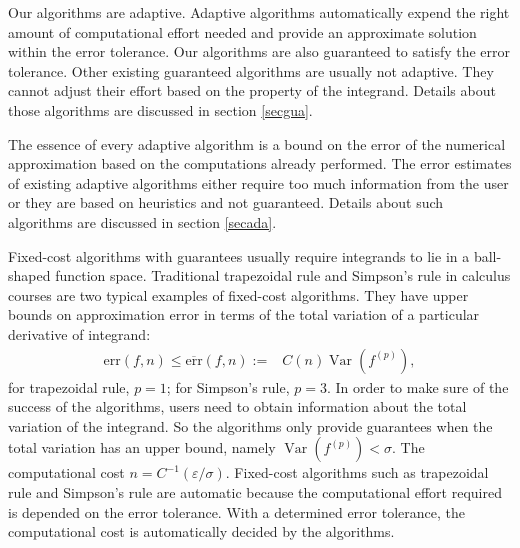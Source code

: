 \documentclass{iitthesis}
\DeclareMathOperator{\Var}{Var}
\theoremstyle{definition}
\theoremstyle{remark}
\begin{document}
Our algorithms are adaptive. Adaptive algorithms automatically expend the right amount of computational effort needed and provide an approximate solution within the error tolerance. Our algorithms are also guaranteed to satisfy the error tolerance. Other existing guaranteed algorithms are usually not adaptive. They cannot adjust their effort based on the property of the integrand. Details about those algorithms are discussed in section \ref{secgua}.

The essence of every adaptive algorithm is a bound on the error of the numerical approximation based on the computations already performed. The error estimates of existing adaptive algorithms either require too much information from the user or they are based on heuristics and not guaranteed. Details about such algorithms are discussed in section \ref{secada}.

\label{secgua}

Fixed-cost algorithms with guarantees usually require integrands to lie in a ball-shaped function space. Traditional trapezoidal rule and Simpson's rule in calculus courses are two typical examples of fixed-cost algorithms. They have upper bounds on approximation error in terms of the total variation of a particular derivative of integrand:
\begin{align}\label{errorsimple}
    \text{err}(f,n)\le\overline{\text{err}}(f,n):=&C(n)\Var(f^{(p)}),
\end{align}
for trapezoidal rule, $p=1$; for Simpson's rule, $p=3$. In order to make sure of the success of the algorithms, users need to obtain information about the total variation of the integrand. So the algorithms only provide guarantees when the total variation has an upper bound, namely $\Var(f^{(p)})<\sigma$. The computational cost $n=C^{-1}(\varepsilon/\sigma)$. Fixed-cost algorithms such as trapezoidal rule and Simpson's rule are automatic because the computational effort required is depended on the error tolerance. With a determined error tolerance, the computational cost is automatically decided by the algorithms.
\end{document}
